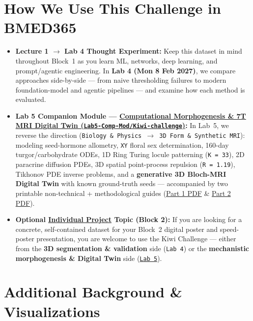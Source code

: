 \documentclass[10pt,a4paper]{article}
\newcommand{\ghblob}{https://github.com/arvidl/BMED365-2027/blob/main}
\begin{document}
\section{How We Use This Challenge in BMED365}

\begin{itemize}
    \item \textbf{Lecture 1 $\to$ Lab 4 Thought Experiment:} Keep this dataset in mind throughout Block~1 as you learn ML, networks, deep learning, and prompt/agentic engineering. In \textbf{Lab 4 (Mon 8 Feb 2027)}, we compare approaches side-by-side --- from naive thresholding failures to modern foundation-model and agentic pipelines --- and examine how each method is evaluated.
    \item \textbf{Lab 5 Companion Module --- \href{\ghblob/Lab5-Comp-Mod/Kiwi-challenge/README.md}{Computational Morphogenesis \& 7T MRI Digital Twin (\nolinkurl{Lab5-Comp-Mod/Kiwi-challenge})}:} In Lab~5, we reverse the direction (\texttt{Biology \& Physics $\to$ 3D Form \& Synthetic MRI}): modeling seed-hormone allometry, \texttt{XY} floral sex determination, 160-day turgor/carbohydrate ODEs, 1D Ring Turing locule patterning (\texttt{K = 33}), 2D paracrine diffusion PDEs, 3D spatial point-process repulsion (\texttt{R = 1.19}), Tikhonov PDE inverse problems, and a \textbf{generative 3D Bloch-MRI Digital Twin} with known ground-truth seeds --- accompanied by two printable non-technical + methodological guides (\href{\ghblob/Lab5-Comp-Mod/Kiwi-challenge/docs/foundations-atlas-and-morphogenesis.pdf}{Part 1 PDF} \& \href{\ghblob/Lab5-Comp-Mod/Kiwi-challenge/docs/inverse-problems-and-digital-twin.pdf}{Part 2 PDF}).
    \item \textbf{Optional \href{\ghblob/Individual-project/README.md}{Individual Project} Topic (Block 2):} If you are looking for a concrete, self-contained dataset for your Block~2 digital poster and speed-poster presentation, you are welcome to use the Kiwi Challenge --- either from the \textbf{3D segmentation \& validation} side (\texttt{Lab 4}) or the \textbf{mechanistic morphogenesis \& Digital Twin} side (\href{\ghblob/Lab5-Comp-Mod/Kiwi-challenge/README.md}{\texttt{Lab 5}}).
\end{itemize}

\section{Additional Background \& Visualizations}
\end{document}
